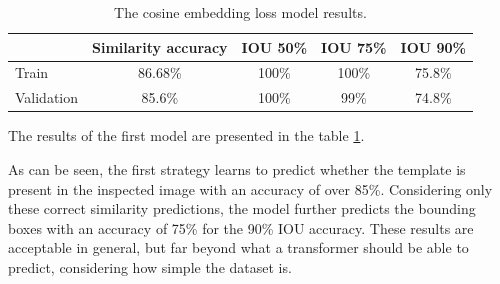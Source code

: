 \documentclass{report}[12pt, a4paper]
\begin{document}

\begin{table}[ht]
    \begin{tabular}{lcccc}
    \hline
                & Similarity accuracy    & IOU 50\%  & IOU 75\%  & IOU 90\%  \\ \hline
    Train       & 86.68\%                & 100\%     & 100\%     & 75.8\%    \\ \hline
    Validation  & 85.6\%                 & 100\%     & 99\%      & 74.8\%    \\ \hline
    \end{tabular}
    \centering
    \caption{The cosine embedding loss model results.}
    \label{table:first_model_accuracies}
\end{table}

The results of the first model are presented in the table \ref{table:first_model_accuracies}.

As can be seen, the first strategy learns to predict whether the template is present in the inspected image with an accuracy of over 85\%. Considering only these correct similarity predictions, the model further predicts the bounding boxes with an accuracy of 75\% for the 90\% IOU accuracy. These results are acceptable in general, but far beyond what a transformer should be able to predict, considering how simple the dataset is.
\end{document}
